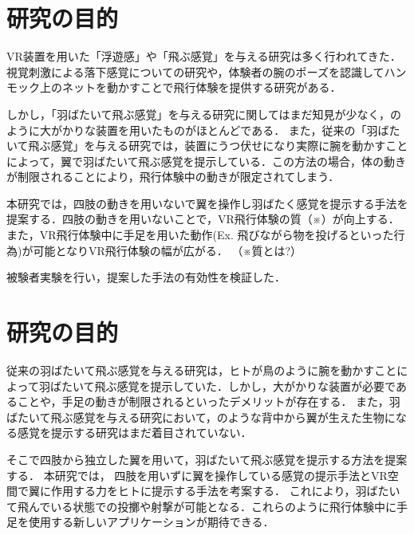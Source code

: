 \section{研究の目的}

        VR装置を用いた「浮遊感」や「飛ぶ感覚」を与える研究は多く行われてきた．視覚刺激による落下感覚についての研究\cite{奥川夏輝2017VR空間における視覚刺激によって発生する落下感覚の分析}や，体験者の腕のポーズを認識してハンモック上のネットを動かすことで飛行体験を提供する研究\cite{鈴木拓馬2014hmd}がある．


        しかし，「羽ばたいて飛ぶ感覚」を与える研究に関してはまだ知見が少なく，のように大がかりな装置を用いたものがほとんどである\cite{rheiner2014birdly}\cite{hypersuit}．
        また，従来の「羽ばたいて飛ぶ感覚」を与える研究では，装置にうつ伏せになり実際に腕を動かすことによって，翼で羽ばたいて飛ぶ感覚を提示している．この方法の場合，体の動きが制限されることにより，飛行体験中の動きが限定されてしまう．
        

        本研究では，四肢の動きを用いないで翼を操作し羽ばたく感覚を提示する手法を提案する．四肢の動きを用いないことで，VR飛行体験の質（※）が向上する．また，VR飛行体験中に手足を用いた動作(Ex. 飛びながら物を投げるといった行為)が可能となりVR飛行体験の幅が広がる．
        （※質とは?）

        被験者実験を行い，提案した手法の有効性を検証した．

\section{研究の目的}
        従来の羽ばたいて飛ぶ感覚を与える研究は，ヒトが鳥のように腕を動かすことによって羽ばたいて飛ぶ感覚を提示していた．しかし，大がかりな装置が必要であることや，手足の動きが制限されるといったデメリットが存在する．
        また，羽ばたいて飛ぶ感覚を与える研究において，のような背中から翼が生えた生物になる感覚を提示する研究はまだ着目されていない．

        そこで四肢から独立した翼を用いて，羽ばたいて飛ぶ感覚を提示する方法を提案する．
        本研究では，
        四肢を用いずに翼を操作している感覚の提示手法とVR空間で翼に作用する力をヒトに提示する手法を考案する．
        これにより，羽ばたいて飛んでいる状態での投擲や射撃が可能となる．これらのように飛行体験中に手足を使用する新しいアプリケーションが期待できる．

